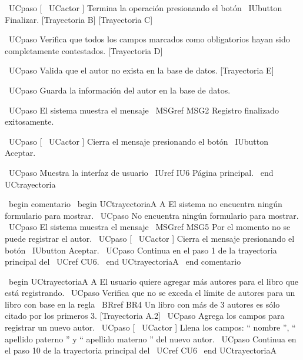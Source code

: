     \ UCpaso [ \ UCactor ] Termina la operación presionando el botón \ IUbutton {Finalizar}. [Trayectoria B] [Trayectoria C]

    \ UCpaso Verifica que todos los campos marcados como obligatorios hayan sido completamente contestados. [Trayectoria D]

    \ UCpaso Valida que el autor no exista en la base de datos. [Trayectoria E]

    \ UCpaso Guarda la información del autor en la base de datos.

    \ UCpaso El sistema muestra el mensaje \ MSGref {MSG2} {Registro finalizado exitosamente}.

    \ UCpaso [ \ UCactor ] Cierra el mensaje presionando el botón \ IUbutton {Aceptar}.

    \ UCpaso Muestra la interfaz de usuario \ IUref {IU6} {Página principal}.
\ end {UCtrayectoria}


\ begin {comentario}
\ begin {UCtrayectoriaA} {A} {El sistema no encuentra ningún formulario para mostrar.}
	\ UCpaso No encuentra ningún formulario para mostrar.
    \ UCpaso El sistema muestra el mensaje \ MSGref {MSG5} {Por el momento no se puede registrar el autor}.
    \ UCpaso [ \ UCactor ] Cierra el mensaje presionando el botón \ IUbutton {Aceptar}.
    \ UCpaso Continua en el paso 1 de la trayectoria principal del \ UCref {CU6}.
\ end {UCtrayectoriaA}
\ end {comentario}


\ begin {UCtrayectoriaA} {A} {El usuario quiere agregar más autores para el libro que está registrando.}
    \ UCpaso Verifica que no se exceda el límite de autores para un libro con base en la regla \ BRref {BR4} {Un libro con más de 3 autores es sólo citado por los primeros 3}. [Trayectoria A.2]
    \ UCpaso Agrega los campos para registrar un nuevo autor.
    \ UCpaso [ \ UCactor ] Llena los campos: `` nombre '', `` apellido paterno '' y `` apellido materno '' del nuevo autor.
    \ UCpaso Continua en el paso 10 de la trayectoria principal del \ UCref {CU6}
\ end {UCtrayectoriaA}


